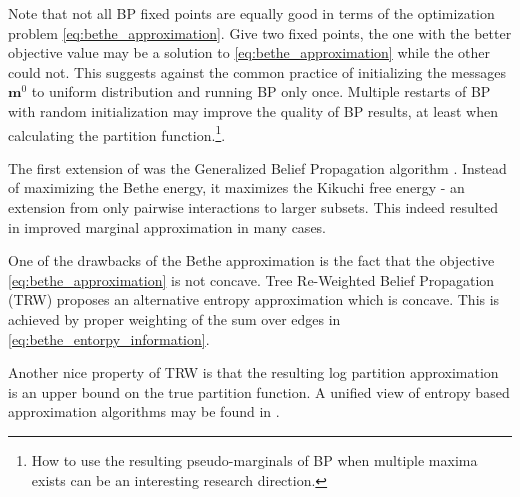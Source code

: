 Note that not all BP fixed points are equally good in terms of the optimization problem \eqref{eq:bethe_approximation}.
Give two fixed points, the one with the better objective value may be a solution to \eqref{eq:bethe_approximation} while the other could not.
This suggests against the common practice of initializing the messages $\boldsymbol{m}^0$ to uniform distribution and running BP only once.
Multiple restarts of BP with random initialization may improve the quality of BP results, at least when calculating the partition function.\footnote{How to use the resulting pseudo-marginals of BP when multiple maxima exists can be an interesting research direction.}.

The first extension of  was the Generalized Belief Propagation algorithm  \cite{yedidia2000generalized}. 
Instead of maximizing the Bethe energy, it maximizes the Kikuchi free energy - an extension from only pairwise interactions to larger subsets. This 
indeed resulted in improved marginal approximation in many cases.


One of the drawbacks of the Bethe approximation is the fact that the objective \eqref{eq:bethe_approximation} is not concave.
Tree Re-Weighted Belief Propagation (TRW)  \cite{wainwright2003tree} proposes an alternative entropy approximation which is concave.
This is achieved by proper weighting of the sum over edges in \eqref{eq:bethe_entorpy_information}.
Another nice property of TRW is that the resulting log partition approximation is an upper bound on the true partition function. 
A unified view of entropy based approximation algorithms may be found in  \cite{meshi2009convexifying}.

